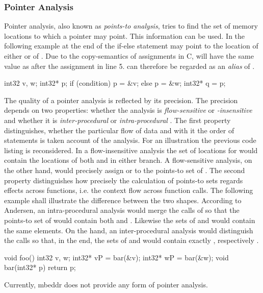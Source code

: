 \subsubsection{Pointer Analysis}
Pointer analysis, also known as \textit{points-to analysis}, tries to find the set of memory locations to which a pointer may point\cite{PointerAnalysisForStructuredParallelPrograms}. This information can be used. In the following example at the end of the if-else statement  may point to the location of either  or of . Due to the copy-semantics of assignments in C,  will have the same value as  after the assignment in line 5.  can therefore be regarded as an \textit{alias} of .
\begin{ccode}
int32 v, w;
int32* p;
if (condition)  p = &v;
else            p = &w; 
int32* q = p;
\end{ccode}
The quality of a pointer analysis is reflected by its precision. The precision depends on two properties: whether the analysis is \textit{flow-sensitive} or \textit{-insensitive} and whether it is \textit{inter-procedural} or \textit{intra-procedural} \cite{ProgramAnalysisAndSpecialization}. The first property distinguishes, whether the particular flow of data and with it the order of statements is taken account of the analysis. For an illustration the previous code listing is reconsidered. In a flow-insensitive analysis the set of locations for  would contain the locations of both  and  in either branch. A flow-sensitive analysis, on the other hand, would precisely assign  or  to the points-to set of . The second property distinguishes how precisely the calculation of points-to sets regards effects across functions, i.e. the context flow across function calls. The following example shall illustrate the difference between the two shapes. According to Andersen, an intra-procedural analysis would merge the calls of  so that the points-to set of  would contain both  and . Likewise the sets of  and  would contain the same elements. On the hand, an inter-procedural analysis would distinguish the calls so that, in the end, the sets of  and  would contain exactly , respectively .
\begin{ccode}
void foo() {
  int32 v, w;
  int32* vP = bar(&v);
  int32* wP = bar(&w);
}
void bar(int32* p) {
  return p;
}
\end{ccode}
Currently, mbeddr does not provide any form of pointer analysis.
